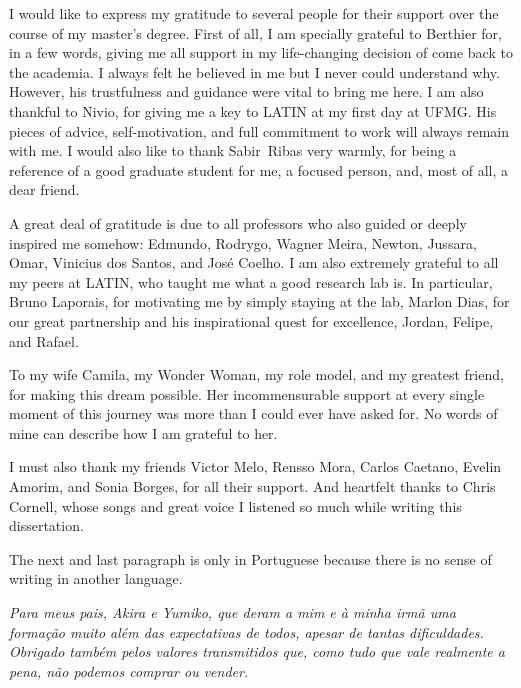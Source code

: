 
I would like to express my gratitude to several people for their support over the course of my master's degree. 
%
First of all, I am specially grateful to Berthier for, in a few words, giving me all support in my life-changing decision of come back to the academia. I always felt he believed in me but I never could understand why. However, his trustfulness and guidance were vital to bring me here. 
%
I am also thankful to Nivio, for giving me a key to LATIN at my first day at UFMG. His pieces of advice, self-motivation, and full commitment to work will always remain with me.
%
I would also like to thank Sabir~Ribas very warmly, for being a reference of a good graduate student for me, a focused person, and, most of all, a dear friend.

A great deal of gratitude is due to all professors who also guided or deeply inspired me somehow: Edmundo, Rodrygo, Wagner Meira, Newton, Jussara, Omar, Vinicius dos Santos, and José Coelho.
%
I am also extremely grateful to all my peers at LATIN, who taught me what a good research lab is. In particular, Bruno Laporais, for motivating me by simply staying at the lab, Marlon Dias, for our great partnership and his inspirational quest for excellence, Jordan, Felipe, and Rafael.

To my wife Camila, my Wonder Woman, my role model, and my greatest friend, for making this dream possible. Her incommensurable support at every single moment of this journey was more than I could ever have asked for. No words of mine can describe how I am grateful to her. 

I must also thank my friends Victor Melo, Rensso Mora, Carlos Caetano, Evelin Amorim, and Sonia Borges, for all their support. 
And heartfelt thanks to Chris Cornell, whose songs and great voice I listened so much while writing this dissertation. 

The next and last paragraph is only in Portuguese because there is no sense of writing in another language. 

\textit{
Para meus pais, Akira e Yumiko, que deram a mim e à minha irmã uma formação muito além das expectativas de todos, apesar de tantas dificuldades. Obrigado também pelos valores transmitidos que, como tudo que vale realmente a pena, não podemos comprar ou vender.
} 


